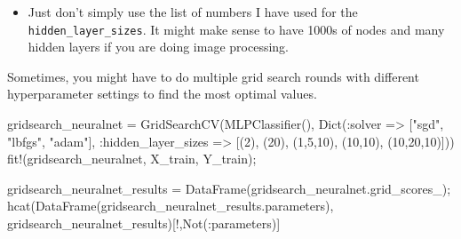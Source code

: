 \documentclass[
  letterpaper,
]{book}
\newenvironment{Shaded}{\begin{snugshade}}{\end{snugshade}}
\newcommand{\FloatTok}[1]{\textcolor[rgb]{0.68,0.00,0.00}{#1}}
\newcommand{\FunctionTok}[1]{\textcolor[rgb]{0.28,0.35,0.67}{#1}}
\newcommand{\NormalTok}[1]{\textcolor[rgb]{0.00,0.23,0.31}{#1}}
\newcommand{\OperatorTok}[1]{\textcolor[rgb]{0.37,0.37,0.37}{#1}}
\newcommand{\StringTok}[1]{\textcolor[rgb]{0.13,0.47,0.30}{#1}}
\providecommand{\tightlist}{%
  \setlength{\itemsep}{0pt}\setlength{\parskip}{0pt}}\usepackage{longtable,booktabs,array}
\begin{document}
\begin{itemize}
\tightlist
\item
  Just don't simply use the list of numbers I have used for the
  \texttt{hidden\_layer\_sizes}. It might make sense to have 1000s of
  nodes and many hidden layers if you are doing image processing.
\end{itemize}

Sometimes, you might have to do multiple grid search rounds with
different hyperparameter settings to find the most optimal values.

\begin{Shaded}
\begin{Highlighting}[]
\NormalTok{gridsearch\_neuralnet }\OperatorTok{=} \FunctionTok{GridSearchCV}\NormalTok{(}\FunctionTok{MLPClassifier}\NormalTok{(),}
            \FunctionTok{Dict}\NormalTok{(}\OperatorTok{:}\NormalTok{solver }\OperatorTok{=\textgreater{}}\NormalTok{ [}\StringTok{"sgd"}\NormalTok{, }\StringTok{"lbfgs"}\NormalTok{, }\StringTok{"adam"}\NormalTok{], }
            \OperatorTok{:}\NormalTok{hidden\_layer\_sizes }\OperatorTok{=\textgreater{}}\NormalTok{ [(}\FloatTok{2}\NormalTok{), (}\FloatTok{20}\NormalTok{), (}\FloatTok{1}\NormalTok{,}\FloatTok{5}\NormalTok{,}\FloatTok{10}\NormalTok{), (}\FloatTok{10}\NormalTok{,}\FloatTok{10}\NormalTok{), (}\FloatTok{10}\NormalTok{,}\FloatTok{20}\NormalTok{,}\FloatTok{10}\NormalTok{)]))}
\FunctionTok{fit!}\NormalTok{(gridsearch\_neuralnet, X\_train, Y\_train);}


\NormalTok{gridsearch\_neuralnet\_results }\OperatorTok{=} \FunctionTok{DataFrame}\NormalTok{(gridsearch\_neuralnet.grid\_scores\_);}
\FunctionTok{hcat}\NormalTok{(}\FunctionTok{DataFrame}\NormalTok{(gridsearch\_neuralnet\_results.parameters),}
\NormalTok{    gridsearch\_neuralnet\_results)[!,}\FunctionTok{Not}\NormalTok{(}\OperatorTok{:}\NormalTok{parameters)]}
\end{Highlighting}
\end{Shaded}
\end{document}
